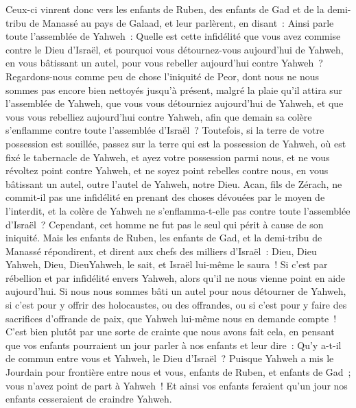 \begin{multicols}{2}
Ceux-ci vinrent donc vers les enfants de Ruben, des enfants de Gad et de la demi-tribu de Manassé au pays de Galaad, et leur parlèrent, en disant~:
Ainsi parle toute l'assemblée de Yahweh~: Quelle est cette infidélité que vous avez commise contre le Dieu d'Israël, et pourquoi vous détournez-vous aujourd'hui de Yahweh, en vous bâtissant un autel, pour vous rebeller aujourd'hui contre Yahweh~?
Regardons-nous comme peu de chose l'iniquité de Peor, dont nous ne nous sommes pas encore bien nettoyés jusqu'à présent, malgré la plaie qu'il attira sur l'assemblée de Yahweh,
que vous vous détourniez aujourd'hui de Yahweh, et que vous vous rebelliez aujourd'hui contre Yahweh, afin que demain sa colère s'enflamme contre toute l'assemblée d'Israël~?
Toutefois, si la terre de votre possession est souillée, passez sur la terre qui est la possession de Yahweh, où est fixé le tabernacle de Yahweh, et ayez votre possession parmi nous, et ne vous révoltez point contre Yahweh, et ne soyez point rebelles contre nous, en vous bâtissant un autel, outre l'autel de Yahweh, notre Dieu.
Acan, fils de Zérach, ne commit-il pas une infidélité en prenant des choses dévouées par le moyen de l'interdit, et la colère de Yahweh ne s'enflamma-t-elle pas contre toute l'assemblée d'Israël~? Cependant, cet homme ne fut pas le seul qui périt à cause de son iniquité.
Mais les enfants de Ruben, les enfants de Gad, et la demi-tribu de Manassé répondirent, et dirent aux chefs des milliers d'Israël~:
Dieu, Dieu Yahweh, Dieu, DieuYahweh, le sait, et Israël lui-même le saura~! Si c'est par rébellion et par infidélité envers Yahweh, alors qu'il ne nous vienne point en aide aujourd'hui.
Si nous nous sommes bâti un autel pour nous détourner de Yahweh, si c'est pour y offrir des holocaustes, ou des offrandes, ou si c'est pour y faire des sacrifices d'offrande de paix, que Yahweh lui-même nous en demande compte~!
C'est bien plutôt par une sorte de crainte que nous avons fait cela, en pensant que vos enfants pourraient un jour parler à nos enfants et leur dire~: Qu'y a-t-il de commun entre vous et Yahweh, le Dieu d'Israël~?
Puisque Yahweh a mis le Jourdain pour frontière entre nous et vous, enfants de Ruben, et enfants de Gad~; vous n'avez point de part à Yahweh~! Et ainsi vos enfants feraient qu'un jour nos enfants cesseraient de craindre Yahweh.

\end{multicols}
